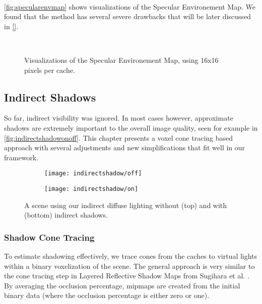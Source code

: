 \documentclass[thesis.tex]{subfiles}
\begin{document}
\\
\autoref{fig:specularenvmap} shows visualizations of the Specular Environement Map.
We found that the method has several severe drawbacks that will be later discussed in \autoref{}. 
\begin{figure}[h!]
\centering
{}
\\
\caption{Visualizations of the Specular Environement Map, using 16x16 pixels per cache.}
\label{fig:specularenvmap}
\end{figure}

\subsection{Indirect Shadows} \label{sec:main:shadowing}
So far, indirect visibility was ignored.
In most cases however, approximate shadows are extremely important to the overall image quality, seen for example in \autoref{fig:indirectshadowonoff}.
This chapter presents a voxel cone tracing based approach with several adjustments and new simplifications that fit well in our framework.
\begin{figure}[h!]
\centering
\begin{subfigure}[b]{\textwidth}
	\texttt{[image: indirectshadow/off]}
\end{subfigure}

\vspace{8pt}
\begin{subfigure}[b]{\textwidth}
	\texttt{[image: indirectshadow/on]}
\end{subfigure}
\caption{A scene using our indirect diffuse lighting without (top) and with (bottom) indirect shadows.}
\label{fig:indirectshadowonoff}
\end{figure}

\subsubsection{Shadow Cone Tracing}\label{sec:impl:voxelization}
To estimate shadowing effectively, we trace cones from the caches to virtual lights within a binary voxelization of the scene.
The general approach is very similar to the cone tracing step in Layered Reflective Shadow Maps from Sugihara et al. \cite{bib:layeredrsm}. %
By averaging the occlusion percentage, mipmaps are created from the initial binary data (where the occlusion percentage is either zero or one).
\end{document}
